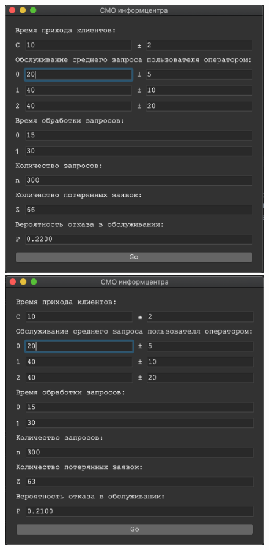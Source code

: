 \documentclass[a4paper,12pt]{article}
\begin{document}
	\begin{figure}[h!]
		\begin{minipage}[b]{0.32\textwidth}
			\includegraphics[width=\textwidth]{1.png}
		\end{minipage}
		\begin{minipage}[b]{0.32\textwidth}
			\includegraphics[width=\textwidth]{2.png}

\end{minipage}
\end{figure}
\end{document}
